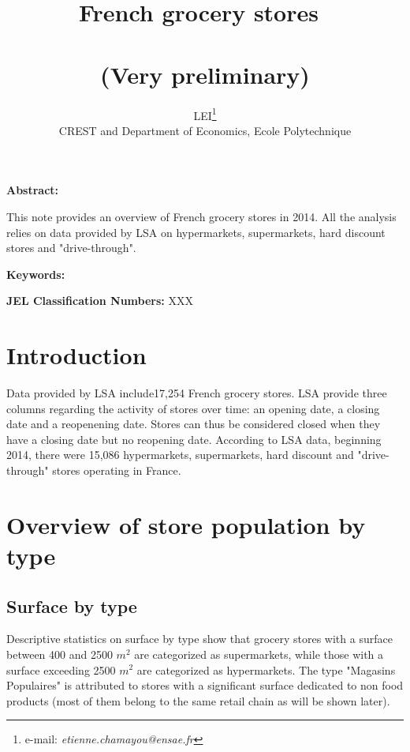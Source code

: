 \documentclass[11pt]{article}
\begin{document}
\title{French grocery stores\ \\ \ \\(Very preliminary)}
\author{LEI\thanks{e-mail:
\textit{etienne.chamayou@ensae.fr}}\medskip\\{\normalsize CREST and Department of Economics, Ecole Polytechnique }}
\maketitle

\sloppy%

\onehalfspacing

\textbf{Abstract:}

This note provides an overview of French grocery stores in 2014. All the analysis relies on data provided by LSA on hypermarkets, supermarkets, hard discount stores and "drive-through".

\strut

\textbf{Keywords:}

\strut

\textbf{JEL Classification Numbers:} XXX

\pagebreak%
\doublespacing

\section{Introduction}

Data provided by LSA include17,254 French grocery stores. LSA provide three columns regarding the activity of stores over time: an opening date, a closing date and a reopenening date. Stores can thus be considered closed when they have a closing date but no reopening date. According to LSA data, beginning 2014, there were 15,086 hypermarkets, supermarkets, hard discount and "drive-through" stores operating in France.



\section{Overview of store population by type}


\subsection{Surface by type}

Descriptive statistics on surface by type show that grocery stores with a surface between 400 and 2500 $m^2$ are categorized as supermarkets, while those with a surface exceeding 2500 $m^2$ are categorized as hypermarkets. The type "Magasins Populaires" is attributed to stores with a significant surface dedicated to non food products (most of them belong to the same retail chain as will be shown later).
\end{document}
